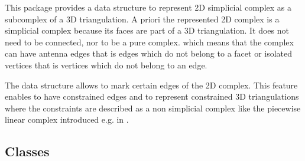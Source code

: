 \label{ref_chapter_C2inT3}

\vspace*{-15mm}
\minitoc
\vspace*{30mm}

This package provides a data structure to  represent 
2D simplicial complex as a subcomplex of a 3D triangulation.
A priori the represented 2D complex is a  simplicial complex
because its faces are part of a 3D triangulation.
It does not need to be connected, nor to be a pure complex.
which  means that the complex can have antenna edges 
that is edges which do not belong to a facet or
isolated vertices that is vertices  which do not belong to
an edge.

The data structure allows to mark certain edges of the 2D complex.
This feature enables  to have  constrained edges
and to represent constrained 3D triangulations
where the constraints are described 
as a non simplicial complex like the piecewise linear complex
introduced  e.g. in \cite{s-cgehd-98}.

\subsection*{Classes}
